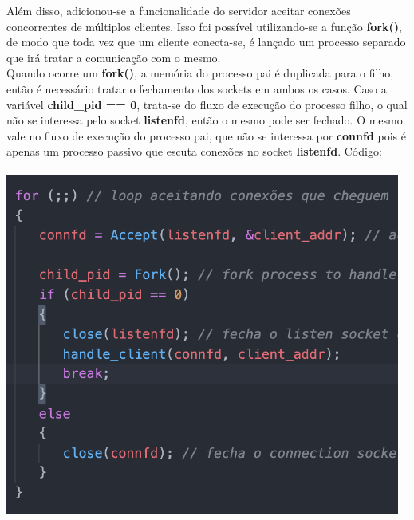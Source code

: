 \documentclass[12pt,a4paper]{report}
\begin{document}
\begin{enumerate}
    Além disso, adicionou-se a funcionalidade do servidor aceitar conexões concorrentes de múltiplos clientes. Isso foi possível utilizando-se a função \textbf{fork()}, de modo que toda vez que um cliente conecta-se, é lançado um processo separado que irá tratar a comunicação com o mesmo.
    \\
    Quando ocorre um \textbf{fork()}, a memória do processo pai é duplicada para o filho, então é necessário tratar o fechamento dos sockets em ambos os casos. Caso a variável \textbf{child\_pid == 0}, trata-se do fluxo de execução do processo filho, o qual não se interessa pelo socket \textbf{listenfd}, então o mesmo pode ser fechado. O mesmo vale no fluxo de execução do processo pai, que não se interessa por \textbf{connfd} pois é apenas um processo passivo que escuta conexões no socket \textbf{listenfd}.
    Código:\\\\
    \includegraphics[width=13cm]{images/ex2-servidor-fork.png}\\
    

\end{enumerate}
\end{document}
